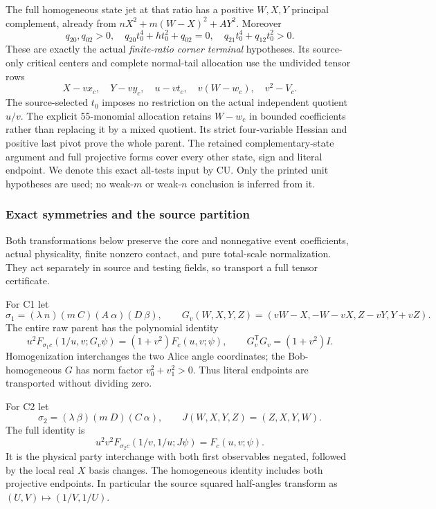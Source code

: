 The full homogeneous state jet at that ratio has a positive
\(W,X,Y\) principal complement, already from
\(nX^2+m(W-X)^2+AY^2\).
Moreover
\[
 q_{20},q_{02}>0,\quad
 q_{20}t_0^4+h t_0^2+q_{02}=0,\quad
 q_{21}t_0^4+q_{12}t_0^2>0.
 \tag{AU11}
\]
These are exactly the actual \emph{finite-ratio corner terminal}
hypotheses. Its source-only critical centers and complete
normal-tail allocation use the undivided tensor rows
\[
 X-vx_c,\quad Y-vy_c,\quad u-vt_c,\quad
 v(W-w_c),\quad v^2-V_c .
\]
The source-selected \(t_0\) imposes no restriction on the actual
independent quotient \(u/v\). The explicit 55-monomial allocation
retains \(W-w_c\) in bounded coefficients rather than replacing it
by a mixed quotient. Its strict four-variable Hessian and positive
last pivot prove the whole parent.
The retained complementary-state argument and full projective
forms cover every other state, sign and literal endpoint.
We denote this exact all-tests input by \(\mathrm{CU}\).
Only the printed unit hypotheses are used; no weak-\(m\) or
weak-\(n\) conclusion is inferred from it.

\subsubsection*{Exact symmetries and the source partition}

Both transformations below preserve the core and nonnegative event
coefficients, actual physicality, finite nonzero contact, and pure
total-scale normalization. They act separately in source and testing
fields, so transport a full tensor certificate.

For C1 let
\[
 \sigma_1=(\lambda\ n)(m\ C)(A\ \alpha)(D\ \beta),\qquad
 G_v(W,X,Y,Z)=(vW-X,-W-vX,Z-vY,Y+vZ).
\]
The entire raw parent has the polynomial identity
\[
 u^2F_{\sigma_1c}(1/u,v;G_v\psi)
       =(1+v^2)F_c(u,v;\psi),\qquad
 G_v^{\mathsf T}G_v=(1+v^2)I .
 \tag{AU12}
\]
Homogenization interchanges the two Alice angle coordinates;
the Bob-homogeneous \(G\) has norm factor \(v_0^2+v_1^2>0\).
Thus literal endpoints are transported without dividing zero.

For C2 let
\[
 \sigma_2=(\lambda\ \beta)(m\ D)(C\ \alpha),\qquad
 J(W,X,Y,Z)=(Z,X,Y,W).
\]
The full identity is
\[
 u^2v^2F_{\sigma_2c}(1/v,1/u;J\psi)=F_c(u,v;\psi).
 \tag{AU13}
\]
It is the physical party interchange with both first observables
negated, followed by the local real \(X\) basis changes.
The homogeneous identity includes both projective endpoints.
In particular the source squared half-angles transform as
\((U,V)\mapsto(1/V,1/U)\).

